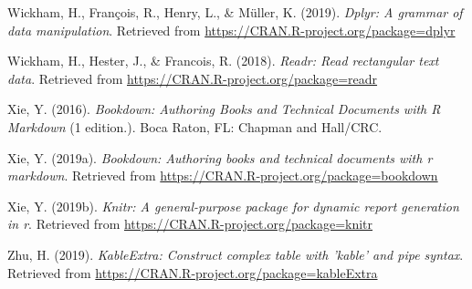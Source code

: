 \documentclass[doc,floatsintext]{apa6}
\begin{document}
\hypertarget{ref-R-dplyr}{}
Wickham, H., François, R., Henry, L., \& Müller, K. (2019). \emph{Dplyr:
A grammar of data manipulation}. Retrieved from
\url{https://CRAN.R-project.org/package=dplyr}

\hypertarget{ref-R-readr}{}
Wickham, H., Hester, J., \& Francois, R. (2018). \emph{Readr: Read
rectangular text data}. Retrieved from
\url{https://CRAN.R-project.org/package=readr}

\hypertarget{ref-xieBookdownAuthoringBooks2016}{}
Xie, Y. (2016). \emph{Bookdown: Authoring Books and Technical Documents
with R Markdown} (1 edition.). Boca Raton, FL: Chapman and Hall/CRC.

\hypertarget{ref-R-bookdown}{}
Xie, Y. (2019a). \emph{Bookdown: Authoring books and technical documents
with r markdown}. Retrieved from
\url{https://CRAN.R-project.org/package=bookdown}

\hypertarget{ref-R-knitr}{}
Xie, Y. (2019b). \emph{Knitr: A general-purpose package for dynamic
report generation in r}. Retrieved from
\url{https://CRAN.R-project.org/package=knitr}

\hypertarget{ref-R-kableExtra}{}
Zhu, H. (2019). \emph{KableExtra: Construct complex table with 'kable'
and pipe syntax}. Retrieved from
\url{https://CRAN.R-project.org/package=kableExtra}

\endgroup
\end{document}
